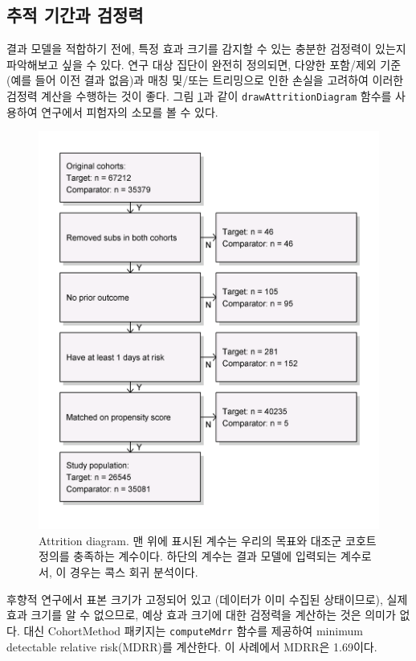 \documentclass[10.5pt]{book}
\theoremstyle{definition}
\theoremstyle{definition}
\theoremstyle{definition}
\theoremstyle{remark}
\begin{document}
\subsection{추적 기간과 검정력}\label{--}

결과 모델을 적합하기 전에, 특정 효과 크기를 감지할 수 있는 충분한
검정력이 있는지 파악해보고 싶을 수 있다. 연구 대상 집단이 완전히
정의되면, 다양한 포함/제외 기준 (예를 들어 이전 결과 없음)과 매칭
및/또는 트리밍으로 인한 손실을 고려하여 이러한 검정력 계산을 수행하는
것이 좋다. 그림 \ref{fig:attrition}과 같이 \texttt{drawAttritionDiagram}
함수를 사용하여 연구에서 피험자의 소모를 볼 수 있다.

\begin{figure}

{\centering \includegraphics[width=0.7\linewidth]{images/PopulationLevelEstimation/attrition} 

}

\caption{Attrition diagram. 맨 위에 표시된 계수는 우리의 목표와 대조군 코호트 정의를 충족하는 계수이다. 하단의 계수는 결과 모델에 입력되는 계수로서, 이 경우는 콕스 회귀 분석이다.}\label{fig:attrition}
\end{figure}

후향적 연구에서 표본 크기가 고정되어 있고 (데이터가 이미 수집된
상태이므로), 실제 효과 크기를 알 수 없으므로, 예상 효과 크기에 대한
검정력을 계산하는 것은 의미가 없다. 대신 CohortMethod 패키지는
\texttt{computeMdrr} 함수를 제공하여 minimum detectable relative
risk(MDRR)를 계산한다. 이 사례에서 MDRR은 1.69이다.
 
\end{document}
